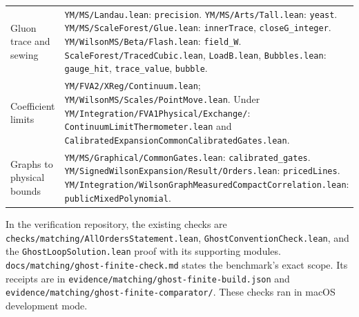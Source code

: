 \documentclass[11pt]{article}
\newcommand{\code}[1]{{\small\nolinkurl{#1}}}
\begin{document}
\begin{longtable}{@{}>{\raggedright\arraybackslash}p{}>{\raggedright\arraybackslash}p{}@{}}
Gluon trace and sewing & \code{YM/MS/Landau.lean}: \code{precision}. \code{YM/MS/Arts/Tall.lean}: \code{yeast}. \code{YM/MS/ScaleForest/Glue.lean}: \code{innerTrace}, \code{closeG_integer}. \code{YM/WilsonMS/Beta/Flash.lean}: \code{field_W}. \code{ScaleForest/TracedCubic.lean}, \code{LoadB.lean}, \code{Bubbles.lean}: \code{gauge_hit}, \code{trace_value}, \code{bubble}.\\[4pt]
Coefficient limits & \code{YM/FVA2/XReg/Continuum.lean}; \code{YM/WilsonMS/Scales/PointMove.lean}. Under \code{YM/Integration/FVA1Physical/Exchange/}: \code{ContinuumLimitThermometer.lean} and \code{CalibratedExpansionCommonCalibratedGates.lean}.\\[4pt]
Graphs to physical bounds & \code{YM/MS/Graphical/CommonGates.lean}: \code{calibrated_gates}. \code{YM/SignedWilsonExpansion/Result/Orders.lean}: \code{pricedLines}. \code{YM/Integration/WilsonGraphMeasuredCompactCorrelation.lean}: \code{publicMixedPolynomial}.\\
\bottomrule
\end{longtable}
\endgroup

In the verification repository, the existing checks are
\code{checks/matching/AllOrdersStatement.lean},
\code{GhostConventionCheck.lean}, and the
\code{GhostLoopSolution.lean} proof with its supporting modules.
\code{docs/matching/ghost-finite-check.md} states the benchmark's exact
scope. Its receipts are in \code{evidence/matching/ghost-finite-build.json}
and \code{evidence/matching/ghost-finite-comparator/}. These checks ran in
macOS development mode.
\end{document}
